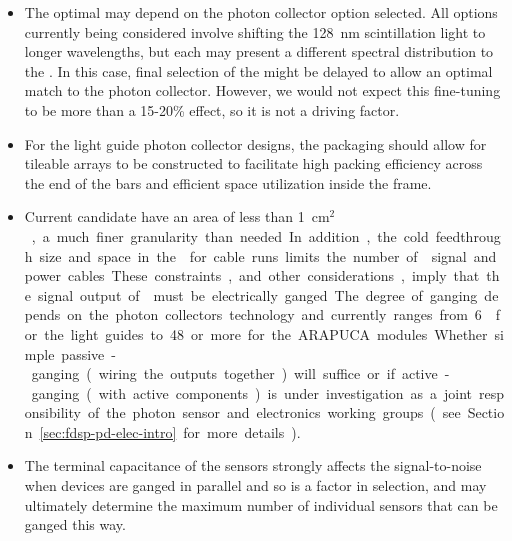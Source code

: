 \begin{itemize}
\item The optimal  may depend on the photon collector option selected.  All 
options currently being considered involve shifting the 128~nm \lar scintillation light to 
longer wavelengths, but each may present a different  spectral distribution to the . 
In this case, final selection of the  might be delayed to allow an optimal match to the photon collector. 
However, we would not expect this fine-tuning to be more than a 15-20\% effect, so it is not a driving factor.

\item For the light guide photon collector designs, the  packaging should allow for tileable arrays to be constructed to facilitate high packing efficiency across the end of the bars and efficient space utilization inside the  frame. 

\item Current candidate  have an area of less than \SI{1}{cm$^2$}, a much finer granularity than needed. In addition, the cold feedthrough size and space in the  for cable runs limits  the number of  signal and power cables. These constraints, and other considerations, imply that the signal output of  must be electrically ganged. The degree of ganging depends on the photon collectors technology and currently ranges from \num{6}~ for the light guides to \num{48} or more for the ARAPUCA modules. Whether simple passive-ganging (wiring the outputs together) will suffice or if active-ganging (with active components) is under investigation as a joint responsibility of the photon sensor and electronics working groups (see Section~\ref{sec:fdsp-pd-elec-intro} for more details).

\item The terminal capacitance of the sensors strongly affects the signal-to-noise when devices are ganged in parallel and so is a factor in  selection, and may ultimately determine the maximum number of individual sensors that can be ganged this way. 

\end{itemize}


